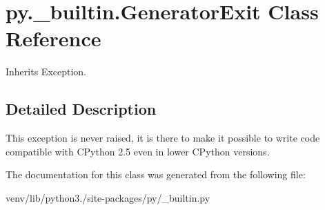 \hypertarget{classpy_1_1__builtin_1_1_generator_exit}{}\section{py.\+\_\+builtin.\+Generator\+Exit Class Reference}
\label{classpy_1_1__builtin_1_1_generator_exit}


Inherits Exception.



\subsection{Detailed Description}
\begin{DoxyVerb}This exception is never raised, it is there to make it possible to
write code compatible with CPython 2.5 even in lower CPython
versions.\end{DoxyVerb}
 

The documentation for this class was generated from the following file\+:\begin{DoxyCompactItemize}
\item 
venv/lib/python3./site-\/packages/py/\+\_\+builtin.\+py\end{DoxyCompactItemize}
